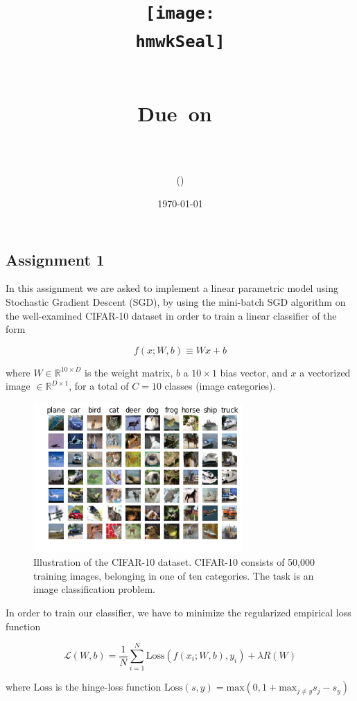 \documentclass{article}
\title{
	\centering
	\texttt{[image: \\hmwkSeal]}
	
	\vspace{1in}
	\textmd{\textbf{\hmwkClass\ \hmwkTitle}}\\
	
	\normalsize\vspace{0.1in}\small{Due\ on\ \hmwkDueDate}\\
	
	\vspace{0.1in}
	\large{\textit{\hmwkClassInstructor}} \\
	\vspace{0.5in}
	
	\large{\hmwkUniversity}
	
	\vspace{3in}
	
	\author{\textbf{\hmwkAuthorName} (\hmwkAuthorID)}
	\date{\today}
}
\begin{document}
	
	\maketitle
	
	\pagebreak
	
	\subsection{Assignment 1}
    
    
    In this assignment we are asked to implement a linear parametric model using Stochastic Gradient Descent (SGD), by using the mini-batch SGD algorithm on the well-examined CIFAR-10 dataset in order to train a linear classifier of the form 
    
    $$f(x;W,b) \equiv Wx + b $$
    
    where $W \in \mathbb{R}^{10 \times D}$ is the weight matrix, $b$ a $10 \times 1$ bias vector, and $x$ a vectorized image $ \in \mathbb{R}^{D \times 1}$, for a total of $C=10$ classes (image categories). \\
    
    \begin{figure}[t]
    	\centering
    	\includegraphics[width=8cm]{images/cifar10.png}
    	\caption{Illustration of the CIFAR-10 dataset.  CIFAR-10 consists of 50,000 training images, belonging in one of ten categories. The task is an image classification problem.}
    \end{figure}

    In order to train our classifier, we have to minimize the regularized empirical loss function
    
    $$\mathcal{L}(W,b) = \frac{1}{N} \sum_{i=1}^{N} \text{Loss}(f(x_i;W,b),y_i) + \lambda R(W)$$
    
    where $\text{Loss}$ is the hinge-loss function $\displaystyle \text{Loss}(s,y) = \text{max}(0, 1 + \text{max}_{j \neq y}s_j - s_y)$ \\
\end{document}
